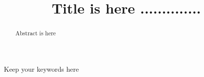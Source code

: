 \documentclass[preprint,11pt]{elsarticle}
\begin{document}
\begin{frontmatter}



\title{Title is here ..............}

%
%
%

%

\begin{abstract}
Abstract is here
\end{abstract}

\begin{keyword}
Keep your keywords here

\end{keyword}

\end{frontmatter}
\end{document}
